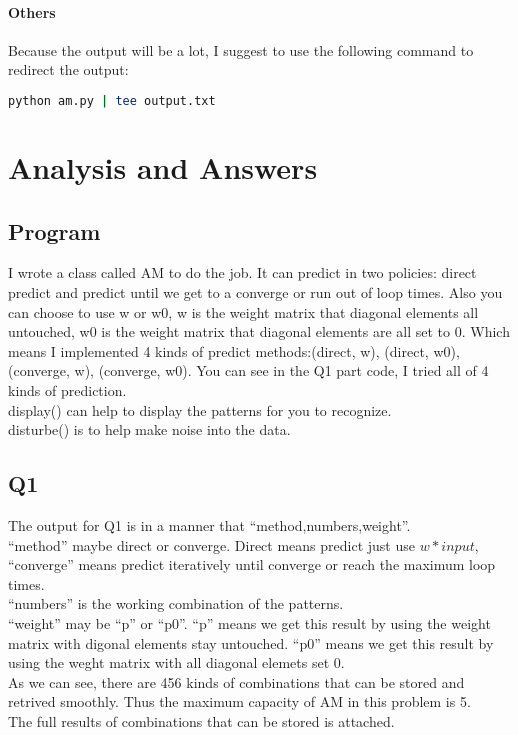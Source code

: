 \documentclass{article}
\begin{document}
  \paragraph{Others}
  Because the output will be a lot, I suggest to use the following command to
  redirect the output:\\
  \begin{lstlisting}[language=Bash]
  python am.py | tee output.txt
  \end{lstlisting}

  \section{Analysis and Answers}
  \subsection{Program}
  I wrote a class called AM to do the job. It can predict in two policies:
  direct predict and predict until we get to a converge or run out of loop
  times. Also you can choose to use w or w0, w is the weight matrix that
  diagonal elements all untouched, w0 is the weight matrix that diagonal
  elements are all set to 0. Which means I implemented 4 kinds of predict
  methods:(direct, w), (direct, w0), (converge, w), (converge, w0). You can see
  in the Q1 part code, I tried all of 4 kinds of prediction.\\
  display() can help to display the patterns for you to recognize.\\
  disturbe() is to help make noise into the data.
  
  \subsection{Q1}
  The output for Q1 is in a manner that ``method,numbers,weight''.\\
  ``method'' maybe direct or converge. Direct means predict just use $w*input$,
  ``converge'' means predict iteratively until converge or reach the maximum
  loop times.\\
  ``numbers'' is the working combination of the patterns.\\
  ``weight'' may be ``p'' or ``p0''. ``p'' means we get this result by using the
  weight matrix with digonal elements stay untouched. ``p0'' means we get this
  result by using the weght matrix with all diagonal elemets set 0.\\
  As we can see, there are 456 kinds of combinations that can be stored and
  retrived smoothly. Thus the maximum capacity of AM in this problem is 5.\\
  The full results of combinations that can be stored is attached.
\end{document}
